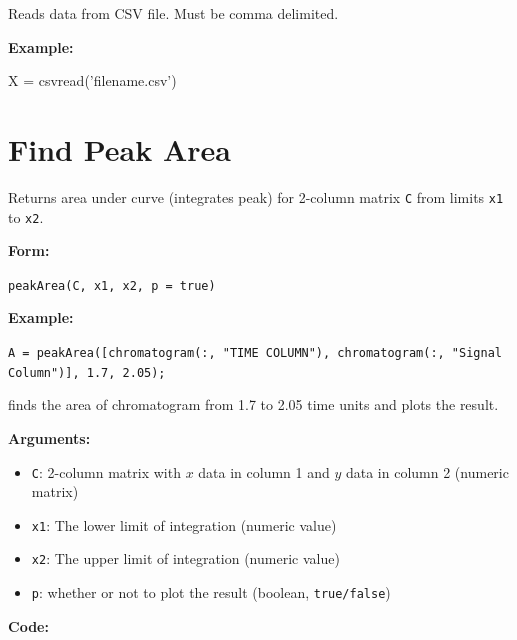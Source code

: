 \documentclass[]{tufte-book}
\newenvironment{Shaded}{}{}
\newcommand{\FunctionTok}[1]{\textcolor[rgb]{0.02,0.16,0.49}{#1}}
\newcommand{\NormalTok}[1]{#1}
\newcommand{\OperatorTok}[1]{\textcolor[rgb]{0.40,0.40,0.40}{#1}}
\newcommand{\StringTok}[1]{\textcolor[rgb]{0.25,0.44,0.63}{#1}}
\begin{document}
Reads data from CSV file. Must be comma delimited.

\textbf{Example:}

\begin{Shaded}
\begin{Highlighting}[]
\NormalTok{X }\OperatorTok{=} \FunctionTok{csvread}\NormalTok{(}\StringTok{'filename.csv'}\NormalTok{)}
\end{Highlighting}
\end{Shaded}

\hypertarget{find-peak-area}{%
\section*{Find Peak Area}\label{find-peak-area}}

Returns area under curve (integrates peak) for 2-column matrix \texttt{C} from limits \texttt{x1} to \texttt{x2}.

\textbf{Form:}

\texttt{peakArea(C,\ x1,\ x2,\ p\ =\ true)}

\textbf{Example:}

\texttt{A\ =\ peakArea({[}chromatogram(:,\ "TIME\ COLUMN"),\ chromatogram(:,\ "Signal\ Column"){]},\ 1.7,\ 2.05);}

finds the area of chromatogram from 1.7 to 2.05 time units and plots the result.

\textbf{Arguments:}

\begin{itemize}
\item
  \texttt{C}: 2-column matrix with \(x\) data in column 1 and \(y\) data in column 2 (numeric matrix)
\item
  \texttt{x1}: The lower limit of integration (numeric value)
\item
  \texttt{x2}: The upper limit of integration (numeric value)
\item
  \texttt{p}: whether or not to plot the result (boolean, \texttt{true/false})
\end{itemize}

\textbf{Code:}
\end{document}
